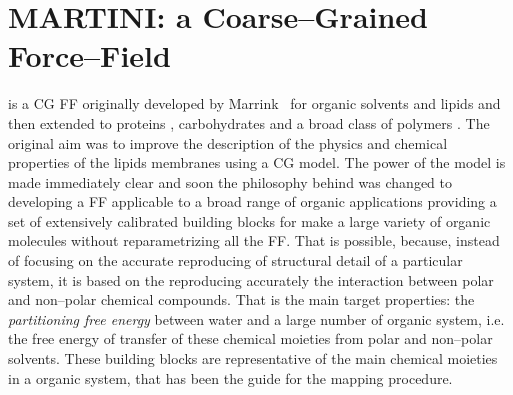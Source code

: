 \section{MARTINI: a Coarse--Grained Force--Field}
\martini is a \ac{CG} \ac{FF} originally developed by Marrink \etal\, \cite{Martini} for organic solvents and lipids and then extended to proteins \cite{MartiniProtein}, carbohydrates \cite{MartiniCarbo} and a broad class of polymers \cite{MartiniPolymers}. The original aim was to improve the description of the physics and chemical properties of the lipids membranes using a \ac{CG} model. The power of the model is made immediately clear and soon the philosophy behind was changed to developing a \ac{FF} applicable to a broad range of organic applications providing a set of extensively calibrated building blocks for make a large variety of organic molecules without reparametrizing all the \ac{FF}. That is possible, because, instead of focusing on the accurate reproducing of structural detail of a particular system, it is based on the reproducing accurately the interaction between polar and non--polar chemical compounds. That is the main target properties: the \textit{partitioning free energy} between water and a large number of organic system, i.e. the free energy of transfer of these chemical moieties from polar and non--polar solvents. These building blocks are representative of the main chemical moieties in a organic system, that has been the guide for the mapping procedure.

